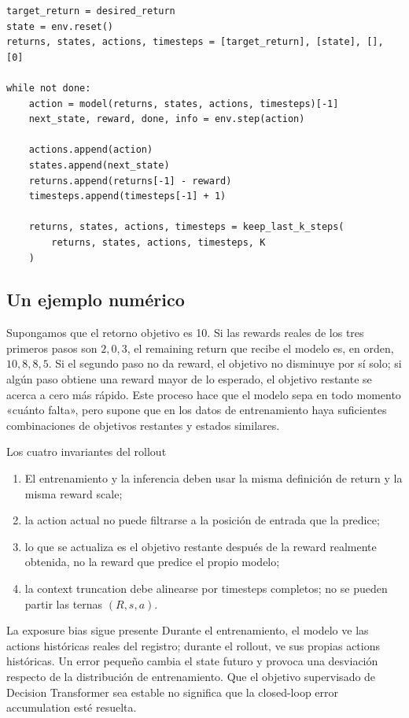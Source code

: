 \documentclass[a4paper]{article}
\begin{document}
\begin{lstlisting}[caption={Rollout autoregressive con return-to-go sin descuento},label={lst:dt-rollout}]
target_return = desired_return
state = env.reset()
returns, states, actions, timesteps = [target_return], [state], [], [0]

while not done:
    action = model(returns, states, actions, timesteps)[-1]
    next_state, reward, done, info = env.step(action)

    actions.append(action)
    states.append(next_state)
    returns.append(returns[-1] - reward)
    timesteps.append(timesteps[-1] + 1)

    returns, states, actions, timesteps = keep_last_k_steps(
        returns, states, actions, timesteps, K
    )
\end{lstlisting}

\subsection{Un ejemplo numérico}

Supongamos que el retorno objetivo es 10. Si las rewards reales de los tres primeros pasos son $2,0,3$, el remaining return que recibe el modelo es, en orden, $10,8,8,5$. Si el segundo paso no da reward, el objetivo no disminuye por sí solo; si algún paso obtiene una reward mayor de lo esperado, el objetivo restante se acerca a cero más rápido. Este proceso hace que el modelo sepa en todo momento «cuánto falta», pero supone que en los datos de entrenamiento haya suficientes combinaciones de objetivos restantes y estados similares.

\begin{importantbox}{Los cuatro invariantes del rollout}
\begin{enumerate}
  \item El entrenamiento y la inferencia deben usar la misma definición de return y la misma reward scale;
  \item la action actual no puede filtrarse a la posición de entrada que la predice;
  \item lo que se actualiza es el objetivo restante después de la reward realmente obtenida, no la reward que predice el propio modelo;
  \item la context truncation debe alinearse por timesteps completos; no se pueden partir las ternas $(R,s,a)$.
\end{enumerate}
\end{importantbox}

\begin{warningbox}{La exposure bias sigue presente}
Durante el entrenamiento, el modelo ve las actions históricas reales del registro; durante el rollout, ve sus propias actions históricas. Un error pequeño cambia el state futuro y provoca una desviación respecto de la distribución de entrenamiento. Que el objetivo supervisado de Decision Transformer sea estable no significa que la closed-loop error accumulation esté resuelta.
\end{warningbox}
\end{document}
